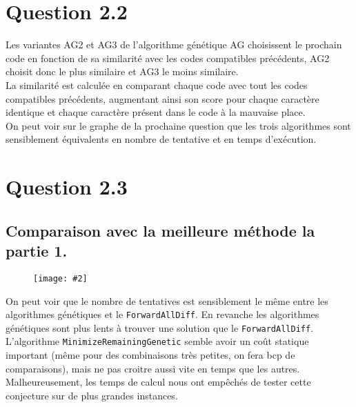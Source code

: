 \documentclass[a4paper, 12pt]{report}
\newcommand{\py}[1]{\texttt{#1}}
\newcommand{\cfigure}[3][6cm]{
	\begin{figure}[H]
		\centering
		\texttt{[image: \#2]}
	\end{figure}
}
\begin{document}
\section*{Question 2.2}

Les variantes AG2 et AG3 de l'algorithme génétique AG choisissent le prochain code en fonction de sa similarité avec les codes compatibles précédents, AG2 choisit donc le plus similaire et AG3 le moins similaire. \\

La similarité est calculée en comparant chaque code avec tout les codes compatibles précédents, augmentant ainsi son score pour chaque caractère identique et chaque caractère présent dans le code à la mauvaise place. \\

On peut voir sur le graphe de la prochaine question que les trois algorithmes sont sensiblement équivalents en nombre de tentative et en temps d'exécution. 

\section*{Question 2.3}

\subsection*{Comparaison avec la meilleure méthode la partie 1.}

\cfigure[8cm]{q22.png}{}

On peut voir que le nombre de tentatives est sensiblement le même entre les algorithmes génétiques et le \py{ForwardAllDiff}. En revanche les algorithmes génétiques sont plus lents à trouver une solution que le \py{ForwardAllDiff}. \\

L'algorithme \py{MinimizeRemainingGenetic} semble avoir un coût statique important (même pour des combinaisons très petites, on fera bcp de comparaisons), mais ne pas croitre aussi vite en temps que les autres. Malheureusement, les temps de calcul nous ont empêchés de tester cette conjecture sur de plus grandes instances.
\end{document}
